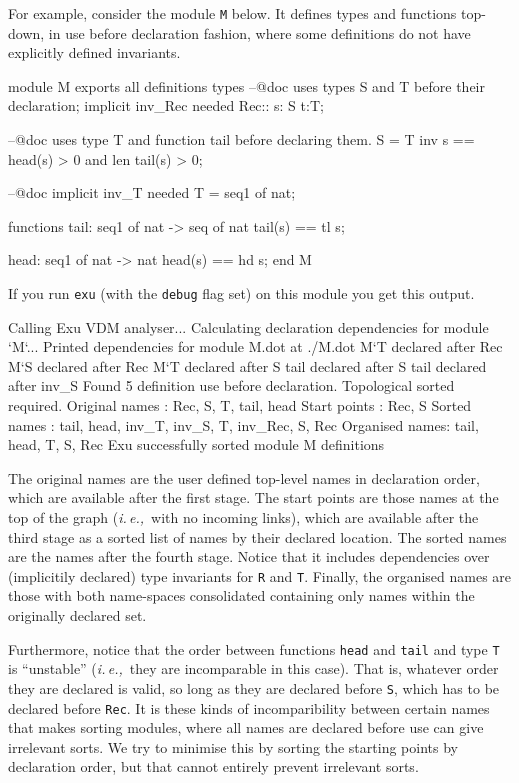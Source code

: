 \documentclass[runningheads,a4paper]{llncs}
\newcommand{\ie}{{\em i.\,e.,\/}}
\begin{document}
For example, consider the module \verb'M' below. It defines types and functions top-down, in use before declaration fashion, where some definitions do not have explicitly defined invariants. 
%
\begin{vdmsl}[frame=none,basicstyle=\ttfamily\scriptsize,numbers=left,stepnumber=1]
    module M 
    exports all
    definitions 
    types 
        --@doc uses types S and T before their declaration; implicit inv_Rec needed
        Rec:: s: S t:T;
        
        --@doc uses type T and function tail before declaring them.
        S = T inv s == head(s) > 0 and len tail(s) > 0;
        
        --@doc implicit inv_T needed
        T = seq1 of nat;

    functions
        tail: seq1 of nat -> seq of nat
        tail(s) == tl s;

        head: seq1 of nat -> nat
        head(s) == hd s;
    end M
\end{vdmsl}
%
If you run \verb'exu' (with the \verb'debug' flag set) on this module you get this output. 
%
\begin{vdmsl}[frame=none,basicstyle=\ttfamily\scriptsize]
    Calling Exu VDM analyser...
    Calculating declaration dependencies for module `M`...
    Printed dependencies for module M.dot at ./M.dot
    M`T declared after Rec
    M`S declared after Rec
    M`T declared after S
    tail declared after S
    tail declared after inv_S
    Found 5 definition use before declaration. Topological sorted required.
    Original names : Rec, S, T, tail, head
    Start points   : Rec, S
    Sorted names   : tail, head, inv_T, inv_S, T, inv_Rec, S, Rec
    Organised names: tail, head, T, S, Rec
    Exu successfully sorted module M definitions
\end{vdmsl}
%
The original names are the user defined top-level names in declaration order, which are available after the first stage. The start points are those names at the top of the graph (\ie~with no incoming links), which are available after the third stage as a sorted list of names by their declared location. The sorted names are the names after the fourth stage. Notice that it includes dependencies over (implicitily declared) type invariants for \verb'R' and \verb'T'. Finally, the organised names are those with both name-spaces consolidated containing only names within the originally declared set. 

Furthermore, notice that the order between functions \verb'head' and \verb'tail' and type \verb'T' is ``unstable'' (\ie~they are incomparable in this case). That is, whatever order they are declared is valid, so long as they are declared before \verb'S', which has to be declared before \verb'Rec'. It is these kinds of incomparibility between certain names that makes sorting modules, where all names are declared before use can give irrelevant sorts. We try to minimise this by sorting the starting points by declaration order, but that cannot entirely prevent irrelevant sorts.  
\end{document}
